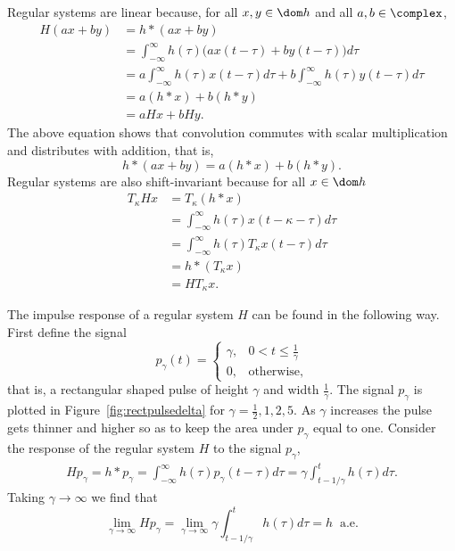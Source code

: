 Regular systems are linear because, for all $x, y \in \dom h$ and all $a, b \in \complex$,
\begin{equation}\begin{split}\label{eq:regsystemislinear}
H(ax + by) &= h * (ax + by) \\
&= \int_{-\infty}^{\infty} h(\tau) \big(ax(t - \tau) + by(t - \tau)\big) d\tau \\
&= a\int_{-\infty}^{\infty} h(\tau) x(t - \tau) d\tau + b\int_{-\infty}^{\infty} h(\tau)y(t - \tau) d\tau \\
&= a (h * x) + b(h*y) \\
&= a Hx + bHy.
\end{split}\end{equation}
The above equation shows that convolution commutes with scalar multiplication and distributes with addition, that is,
\[
h * (ax + by) =  a (h * x) + b(h*y).
\]
Regular systems are also shift-invariant because for all $x \in \dom h$
\begin{align*}
T_\kappa H x &= T_\kappa(h * x ) \\
&= \int_{-\infty}^{\infty} h(\tau) x(t- \kappa - \tau) d\tau \\
&= \int_{-\infty}^{\infty} h(\tau) T_\kappa x(t - \tau) d\tau \\ 
&= h * (T_\kappa x) \\
&= H T_\kappa x. 
\end{align*}

The impulse response of a regular system $H$ can be found in the following way.  First define the signal
\[
p_\gamma(t) = \begin{cases}
\gamma, & 0 < t \leq \frac{1}{\gamma} \\
0, & \text{otherwise},
\end{cases}
\]
that is, a rectangular shaped pulse of height $\gamma$ and width $\tfrac{1}{\gamma}$.  The signal $p_\gamma$ is plotted in Figure~\ref{fig:rectpulsedelta} for $\gamma=\frac{1}{2},1,2,5$.  As $\gamma$ increases the pulse gets thinner and higher so as to keep the area under $p_\gamma$ equal to one.  Consider the response of the regular system $H$ to the signal $p_\gamma$,
\begin{align*}
H p_\gamma = h * p_\gamma = \int_{-\infty}^\infty h(\tau) p_\gamma(t - \tau) d\tau = \gamma \int_{t- 1/\gamma}^{t} h(\tau) d\tau.
\end{align*}
Taking $\gamma \to \infty$ we find that
\[
\lim_{\gamma \rightarrow \infty} H p_\gamma = \lim_{\gamma \rightarrow \infty} \gamma \int_{t- 1/\gamma}^{t} h(\tau) d\tau = h \;\; \text{a.e.}
\]

